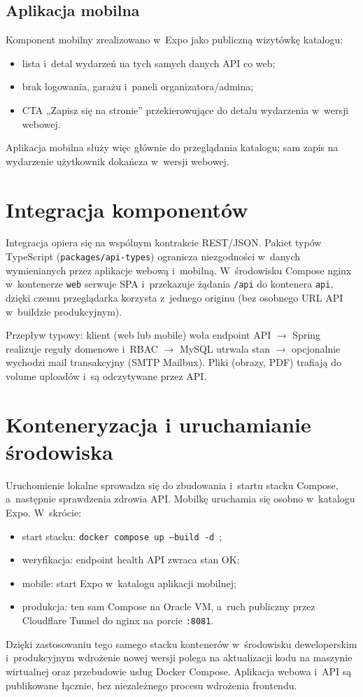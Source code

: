 \documentclass{sprz}
\begin{document}
\subsection{Aplikacja mobilna}
Komponent mobilny zrealizowano w~Expo jako publiczną wizytówkę katalogu:
\begin{itemize}
  \item lista i~detal wydarzeń na tych samych danych API co web;
  \item brak logowania, garażu i~paneli organizatora/admina;
  \item CTA „Zapisz się na stronie” przekierowujące do detalu wydarzenia w~wersji webowej.
\end{itemize}
Aplikacja mobilna służy więc głównie do przeglądania katalogu; sam zapis na wydarzenie użytkownik dokańcza w~wersji webowej.

\section{Integracja komponentów}
Integracja opiera się na wspólnym kontrakcie REST/JSON. Pakiet typów TypeScript (\texttt{packages/api-types}) ogranicza niezgodności w~danych wymienianych przez aplikacje webową i~mobilną. W~środowisku Compose nginx w~kontenerze \texttt{web} serwuje SPA i~przekazuje żądania \texttt{/api} do kontenera \texttt{api}, dzięki czemu przeglądarka korzysta z~jednego originu (bez osobnego URL API w~buildzie produkcyjnym).

Przepływ typowy: klient (web lub mobile) woła endpoint API $\rightarrow$ Spring realizuje reguły domenowe i~RBAC $\rightarrow$ MySQL utrwala stan $\rightarrow$ opcjonalnie wychodzi mail transakcyjny (SMTP Mailbux). Pliki (obrazy, PDF) trafiają do volume uploadów i~są odczytywane przez API.

\section{Konteneryzacja i uruchamianie środowiska}
Uruchomienie lokalne sprowadza się do zbudowania i~startu stacku Compose, a~następnie sprawdzenia zdrowia API. Mobilkę uruchamia się osobno w~katalogu Expo. W~skrócie:
\begin{itemize}
  \item start stacku: \texttt{docker compose up --build -d}~\cite{docker:compose};
  \item weryfikacja: endpoint health API zwraca stan OK;
  \item mobile: start Expo w~katalogu aplikacji mobilnej;
  \item produkcja: ten sam Compose na Oracle VM, a~ruch publiczny przez Cloudflare Tunnel do nginx na porcie \texttt{:8081}.
\end{itemize}
Dzięki zastosowaniu tego samego stacku kontenerów w~środowisku deweloperskim i~produkcyjnym wdrożenie nowej wersji polega na aktualizacji kodu na maszynie wirtualnej oraz przebudowie usług Docker Compose. Aplikacja webowa i~API są publikowane łącznie, bez niezależnego procesu wdrożenia frontendu.
\end{document}
